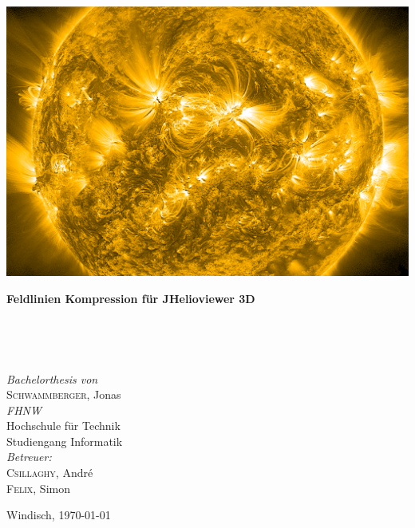 
\thispagestyle{titlestyle}

\includegraphics[width=1\textwidth]{./pictures/title3.png}\\

\begin{onehalfspace}
\begin{huge}
\textbf{Feldlinien Kompression für JHelioviewer 3D}
\end{huge}
\vspace{0.1cm}\\
\begin{Large}
\end{Large}
\vspace{0.8cm}\\
\begin{large}
\emph{Bachelorthesis von}\\
\textsc{Schwammberger}, Jonas\vspace{0.8cm}\\
\emph{FHNW}\\
Hochschule für Technik\\
Studiengang Informatik\vspace{0.8cm}\\
\emph{Betreuer:}\\
\textsc{Csillaghy}, André\\
\textsc{Felix}, Simon\vspace{0.8cm}\\
\end{large}
\end{onehalfspace}
\vfill
\begin{normalsize}
Windisch, \today
\end{normalsize}
\pagebreak